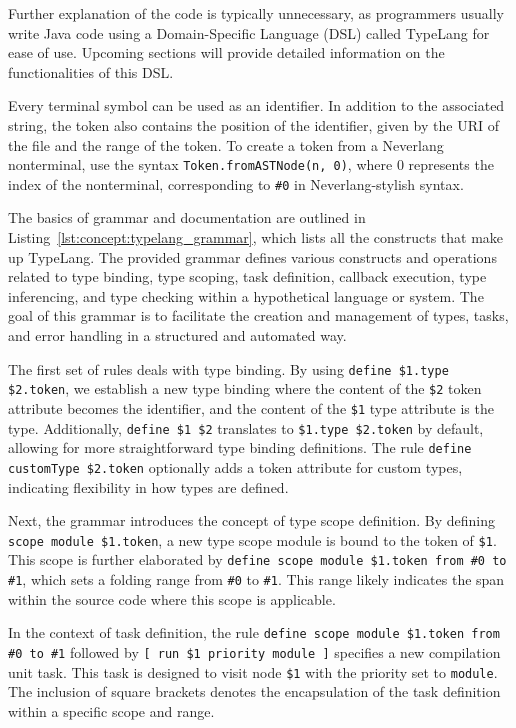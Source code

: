 Further explanation of the code is typically unnecessary, as programmers usually write Java code using a Domain-Specific Language (DSL) called TypeLang for ease of use. Upcoming sections will provide detailed information on the functionalities of this DSL.


Every terminal symbol can be used as an identifier. In addition to the associated string, the token also contains the position of the identifier, given by the URI of the file and the range of the token. To create a token from a Neverlang nonterminal, use the syntax \texttt{Token.fromASTNode(n, 0)}, where 0 represents the index of the nonterminal, corresponding to \texttt{\#0} in Neverlang-stylish syntax.

The basics of grammar and documentation are outlined in Listing~\ref{lst:concept:typelang_grammar}, which lists all the constructs that make up TypeLang.
The provided grammar defines various constructs and operations related to type binding, type scoping, task definition, callback execution, type inferencing, and type checking within a hypothetical language or system. The goal of this grammar is to facilitate the creation and management of types, tasks, and error handling in a structured and automated way.

The first set of rules deals with type binding. By using \texttt{define \$1.type \$2.token}, we establish a new type binding where the content of the \texttt{\$2} token attribute becomes the identifier, and the content of the \texttt{\$1} type attribute is the type. Additionally, \texttt{define \$1 \$2} translates to \texttt{\$1.type \$2.token} by default, allowing for more straightforward type binding definitions. The rule \texttt{define customType \$2.token} optionally adds a token attribute for custom types, indicating flexibility in how types are defined.

Next, the grammar introduces the concept of type scope definition. By defining \texttt{scope module \$1.token}, a new type scope module is bound to the token of \texttt{\$1}. This scope is further elaborated by \texttt{define scope module \$1.token from \#0 to \#1}, which sets a folding range from \texttt{\#0} to \texttt{\#1}. This range likely indicates the span within the source code where this scope is applicable.

In the context of task definition, the rule \texttt{define scope module \$1.token from \#0 to \#1} followed by \texttt{[ run \$1 priority module ]} specifies a new compilation unit task. This task is designed to visit node \texttt{\$1} with the priority set to \texttt{module}. The inclusion of square brackets denotes the encapsulation of the task definition within a specific scope and range.

